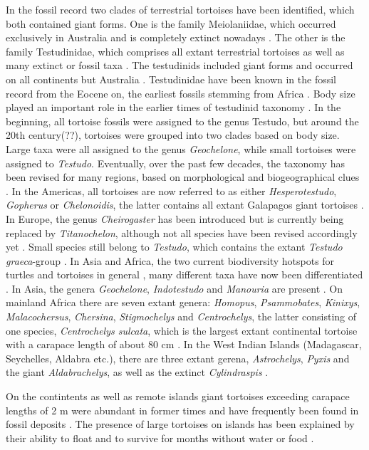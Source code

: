In the fossil record two clades of terrestrial tortoises have been identified, which both contained giant forms. One is the family Meiolaniidae, which occurred exclusively in Australia and is completely extinct nowadays \citep{.}. The other is the family Testudinidae, which comprises all extant terrestrial tortoises as well as many extinct or fossil taxa \citep{.}. The testudinids included giant forms and occurred on all continents but Australia \citep{.}.
Testudinidae have been known in the fossil record from the Eocene on, the earliest fossils stemming from Africa \citep{.}.
Body size played an important role in the earlier times of testudinid taxonomy \citep{.}. In the beginning, all tortoise fossils were assigned to the genus Testudo, but around the 20th century(??), tortoises were grouped into two clades based on body size. Large taxa were all assigned to the genus \textit{Geochelone}, while small tortoises were assigned to \textit{Testudo}.
Eventually, over the past few decades, the taxonomy has been revised for many regions, based on morphological and biogeographical clues \citep{.}. In the Americas, all tortoises are now referred to as either \textit{Hesperotestudo}, \textit{Gopherus} or \textit{Chelonoidis}, the latter contains all extant Galapagos giant tortoises \citep{.}. In Europe, the genus \textit{Cheirogaster} has been introduced but is currently being replaced by \textit{Titanochelon}, although not all species have been revised accordingly yet \citep{.}. Small species still belong to \textit{Testudo}, which contains the extant \textit{Testudo graeca}-group \citep{.}.
In Asia and Africa, the two current biodiversity hotspots for turtles and tortoises in general \citep{.}, many different taxa have now been differentiated \citep{.}.
In Asia, the genera \textit{Geochelone}, \textit{Indotestudo} and \textit{Manouria} are present \citep{.}. On mainland Africa there are seven extant genera: \textit{Homopus}, \textit{Psammobates}, \textit{Kinixys}, \textit{Malacochersus}, \textit{Chersina}, \textit{Stigmochelys} and \textit{Centrochelys}, the latter consisting of one species, \textit{Centrochelys sulcata}, which is the largest extant continental tortoise with a carapace length of about 80 cm \citep{.}. In the West Indian Islands (Madagascar, Seychelles, Aldabra etc.), there are three extant gerena, \textit{Astrochelys}, \textit{Pyxis} and the giant \textit{Aldabrachelys}, as well as the extinct \textit{Cylindraspis} \citep{.}.

On the contintents as well as remote islands giant tortoises exceeding carapace lengths of 2 m were abundant in former times and have frequently been found in fossil deposits \citep{.}. The presence of large tortoises on islands has been explained by their ability to float and to survive for months without water or food \citep{Gerlach2006, Patterson1973, Cheke2016}. 

